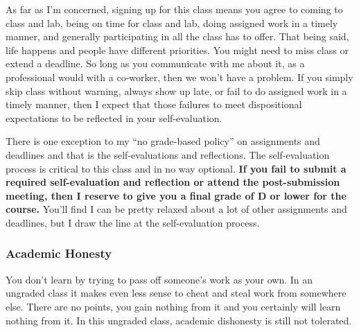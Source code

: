 \documentclass[10pt]{article}
\begin{document}
As far as I'm concerned, signing up for this class means you agree to coming to class and lab, being on time for class and lab, doing assigned work in a timely manner, and generally participating in all the class has to offer.  That being said, life happens and people have different priorities.  You might need to miss class or extend a deadline.  So long as you communicate with me about it, as a professional would with a co-worker, then we won't have a problem. If you simply skip class without warning, always show up late, or fail to do assigned work in a timely manner, then I expect that those failures to meet dispositional expectations to be reflected in your self-evaluation.

There is one exception to my ``no grade-based policy'' on assignments and deadlines and that is the self-evaluations and reflections. The self-evaluation process is critical to this class and in no way optional. \textbf{If you fail to submit a required self-evaluation and reflection or attend the post-submission meeting, then I reserve to give you a final grade of D or lower for the course.} You'll find I can be pretty relaxed about a lot of other assignments and deadlines, but I draw the line at the self-evaluation process.


\subsubsection*{Academic Honesty}

You don't learn by trying to pass off someone's work as your own. In an ungraded class it makes even less sense to cheat and steal work from somewhere else.  There are no points, you gain nothing from it and you certainly will learn nothing from it. In this ungraded class, academic dishonesty is still not tolerated.
\end{document}
